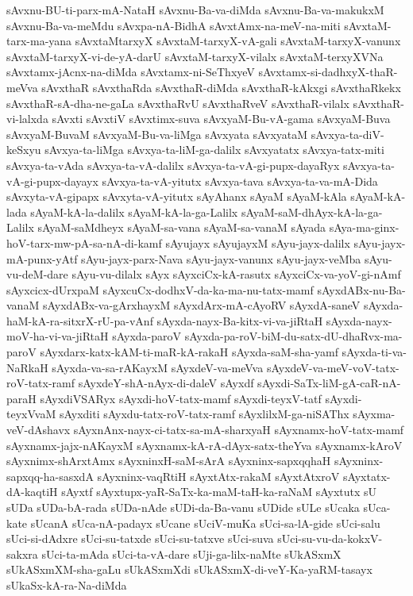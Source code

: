 {sAvxnu-BU-ti-parx-mA-NataH
sAvxnu-Ba-va-diMda
sAvxnu-Ba-va-makukxM
sAvxnu-Ba-va-meMdu
sAvxpa-nA-BidhA
sAvxtAmx-na-meV-na-miti
sAvxtaM-tarx-ma-yana
sAvxtaMtarxyX
sAvxtaM-tarxyX-vA-gali
sAvxtaM-tarxyX-vanunx
sAvxtaM-tarxyX-vi-de-yA-darU
sAvxtaM-tarxyX-vilalx
sAvxtaM-terxyXVNa
sAvxtamx-jAcnx-na-diMda
sAvxtamx-ni-SeThxyeV
sAvxtamx-si-dadhxyX-thaR-meVva
sAvxthaR
sAvxthaRda
sAvxthaR-diMda
sAvxthaR-kAkxgi
sAvxthaRkekx
sAvxthaR-sA-dha-ne-gaLa
sAvxthaRvU
sAvxthaRveV
sAvxthaR-vilalx
sAvxthaR-vi-lalxda
sAvxti
sAvxtiV
sAvxtimx-suva
sAvxyaM-Bu-vA-gama
sAvxyaM-Buva
sAvxyaM-BuvaM
sAvxyaM-Bu-va-liMga
sAvxyata
sAvxyataM
sAvxya-ta-diV-keSxyu
sAvxya-ta-liMga
sAvxya-ta-liM-ga-dalilx
sAvxyatatx
sAvxya-tatx-miti
sAvxya-ta-vAda
sAvxya-ta-vA-dalilx
sAvxya-ta-vA-gi-pupx-dayaRyx
sAvxya-ta-vA-gi-pupx-dayayx
sAvxya-ta-vA-yitutx
sAvxya-tava
sAvxya-ta-va-mA-Dida
sAvxyta-vA-gipapx
sAvxyta-vA-yitutx
sAyAhanx
sAyaM
sAyaM-kAla
sAyaM-kA-lada
sAyaM-kA-la-dalilx
sAyaM-kA-la-ga-Lalilx
sAyaM-saM-dhAyx-kA-la-ga-Lalilx
sAyaM-saMdheyx
sAyaM-sa-vana
sAyaM-sa-vanaM
sAyada
sAya-ma-ginx-hoV-tarx-mw-pA-sa-nA-di-kamf
sAyujayx
sAyujayxM
sAyu-jayx-dalilx
sAyu-jayx-mA-punx-yAtf
sAyu-jayx-parx-Nava
sAyu-jayx-vanunx
sAyu-jayx-veMba
sAyu-vu-deM-dare
sAyu-vu-dilalx
sAyx
sAyxciCx-kA-rasutx
sAyxciCx-va-yoV-gi-nAmf
sAyxcicx-dUrxpaM
sAyxcuCx-dodhxV-da-ka-ma-nu-tatx-mamf
sAyxdABx-nu-Ba-vanaM
sAyxdABx-va-gArxhayxM
sAyxdArx-mA-cAyoRV
sAyxdA-saneV
sAyxda-haM-kA-ra-sitxrX-rU-pa-vAnf
sAyxda-nayx-Ba-kitx-vi-va-jiRtaH
sAyxda-nayx-moV-ha-vi-va-jiRtaH
sAyxda-paroV
sAyxda-pa-roV-biM-du-satx-dU-dhaRvx-ma-paroV
sAyxdarx-katx-kAM-ti-maR-kA-rakaH
sAyxda-saM-sha-yamf
sAyxda-ti-va-NaRkaH
sAyxda-va-sa-rAKayxM
sAyxdeV-va-meVva
sAyxdeV-va-meV-voV-tatx-roV-tatx-ramf
sAyxdeY-shA-nAyx-di-daleV
sAyxdf
sAyxdi-SaTx-liM-gA-caR-nA-paraH
sAyxdiVSARyx
sAyxdi-hoV-tatx-mamf
sAyxdi-teyxV-tatf
sAyxdi-teyxVvaM
sAyxditi
sAyxdu-tatx-roV-tatx-ramf
sAyxlilxM-ga-niSAThx
sAyxma-veV-dAshavx
sAyxnAnx-nayx-ci-tatx-sa-mA-sharxyaH
sAyxnamx-hoV-tatx-mamf
sAyxnamx-jajx-nAKayxM
sAyxnamx-kA-rA-dAyx-satx-theYva
sAyxnamx-kAroV
sAyxnimx-shArxtAmx
sAyxninxH-saM-sArA
sAyxninx-sapxqqhaH
sAyxninx-sapxqq-ha-sasxdA
sAyxninx-vaqRtiH
sAyxtAtx-rakaM
sAyxtAtxroV
sAyxtatx-dA-kaqtiH
sAyxtf
sAyxtupx-yaR-SaTx-ka-maM-taH-ka-raNaM
sAyxtutx
sU
sUDa
sUDa-bA-rada
sUDa-nAde
sUDi-da-Ba-vanu
sUDide
sULe
sUcaka
sUca-kate
sUcanA
sUca-nA-padayx
sUcane
sUciV-muKa
sUci-sa-lA-gide
sUci-salu
sUci-si-dAdxre
sUci-su-tatxde
sUci-su-tatxve
sUci-suva
sUci-su-vu-da-kokxV-sakxra
sUci-ta-mAda
sUci-ta-vA-dare
sUji-ga-lilx-naMte
sUkASxmX
sUkASxmXM-sha-gaLu
sUkASxmXdi
sUkASxmX-di-veY-Ka-yaRM-tasayx
sUkaSx-kA-ra-Na-diMda
}
